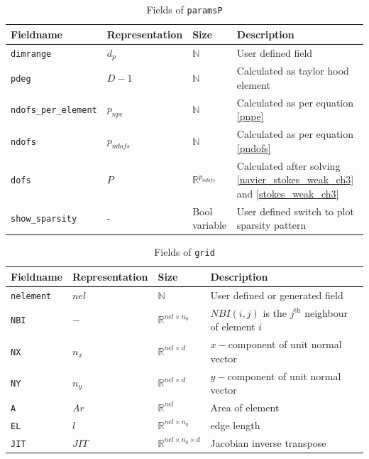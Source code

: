 \documentclass[a4paper]{book}
\begin{document}
\begin{table}[H]
\cprotect\caption{Fields of \verb|paramsP|}
\label{table_paramsP}
\begin{center}
\begin{tabular}{| p{}| p{} |  p{} | p{}|}
\hline
\textbf{Fieldname} & \textbf{Representation} & \textbf{Size} & \textbf{Description}\\
\hline
\verb|dimrange| & $d_p$ & $\mathbb{N}$ & User defined field\\
\hline
\verb|pdeg| & $D-1$ & $\mathbb{N}$ & Calculated as taylor hood element\\
\hline
\verb|ndofs_per_element| & $p_{npe}$ & $\mathbb{N}$ & Calculated as per equation \ref{pnpe}\\
\hline
\verb|ndofs| & $p_{ndofs}$ & $\mathbb{N}$ & Calculated as per equation \ref{pndofs}\\
\hline
\verb|dofs| & $P$ & $\mathbb{R}^{p_{ndofs}}$ & Calculated after solving \ref{navier_stokes_weak_ch3} and \ref{stokes_weak_ch3}\\
\hline
\verb|show_sparsity| & - & Bool variable & User defined switch to plot sparsity pattern\\
\hline
\end{tabular}
\end{center}
\end{table}

\begin{table}[H]
\cprotect\caption{Fields of \verb|grid|}
\label{table_grid}
\begin{center}
\begin{tabular}{| p{}| p{} |  p{} | p{}|}
\hline
\textbf{Fieldname} & \textbf{Representation} & \textbf{Size} & \textbf{Description}\\
\hline
\verb|nelement| & $nel$ & $\mathbb{N}$ & User defined or generated field\\
\hline
\verb|NBI| & $-$ & $\mathbb{R}^{nel \times n_0}$ & $NBI(i,j)$ is the $j^{\textrm{th}}$ neighbour of element $i$\\
\hline
\verb|NX| & $n_x$ & $\mathbb{R}^{nel \times d}$ & $x-$component of unit normal vector\\
\hline
\verb|NY| & $n_y$ & $\mathbb{R}^{nel \times d}$ & $y-$component of unit normal vector\\
\hline
\verb|A| & $Ar$ & $\mathbb{R}^{nel}$ & Area of element\\
\hline
\verb|EL| & $l$ & $\mathbb{R}^{nel \times n_0}$ & edge length\\
\hline
\verb|JIT| & $JIT$ & $\mathbb{R}^{nel \times n_0 \times d}$ & Jacobian inverse transpose\\
\hline
\end{tabular}
\end{center}
\end{table}
\end{document}
